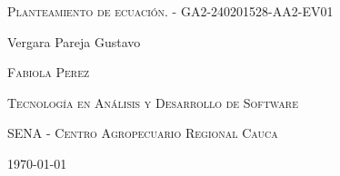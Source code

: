 \documentclass{article}
\author{Gustavo Vergara}
\theoremstyle{mytheoremstyle}
\theoremstyle{mytheoremstyle}
\theoremstyle{myproblemstyle}
\begin{document}
\pgfplotsset{compat=1.18}

\begin{titlepage}
    \centering
    
    
    \vspace{3cm}
    {\scshape \Large Planteamiento de ecuación. - GA2-240201528-AA2-EV01 \par}
    \vspace{6cm}
    \textbf\large\scshape{\par}
         \vspace{0.5cm}
         
    {\Large Vergara Pareja Gustavo\par}
    \vspace{6cm}
    {\scshape\Large Fabiola Perez\par}
    \vspace{0.5cm}
    {\scshape\Large Tecnología en Análisis y Desarrollo de Software \par}
    \vspace{0.5cm}
    {\scshape\Large SENA - Centro Agropecuario Regional Cauca\par}
    \vspace{0.5cm}
    {\Large \today \par}
    \end{titlepage}
\end{document}
